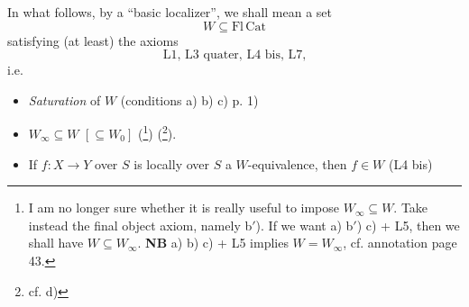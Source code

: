 \documentclass[11pt]{article}
\newcommand{\msp}[1]{\marginpar{\footnotesize [#1]}}
\begin{document}
\msp{page 45}
In what follows, by a ``basic localizer'', we shall mean a set
\[
W \subseteq \mathrm{Fl}\,\mathrm{Cat}
\]
satisfying (at least) the axioms %
\[
\text{L1, L3 quater, L4 bis, L7,}
\]
i.e.

\begin{itemize}
\item[a)] \textit{Saturation} of $W$ (conditions a) b) c) p. 1)

\item[b)] $W_\infty \subseteq W$ $[\subseteq W_0]$ (\footnote[30]{I am no longer sure whether it is really useful to impose $W_\infty \subseteq W$. Take instead the final object axiom, namely b$'$). If we want a) b$'$) c) + L5, then we shall have $W \subseteq W_\infty$. \textbf{NB} a) b) c) + L5 implies $W = W_\infty$, cf. annotation page 43.}) (\footnote[31]{cf. d)}).

\item[c)] If $f : X \longrightarrow Y$ over $S$ is locally over $S$ a $W$-equivalence, then $f \in W$ (L4 bis)
\end{itemize}
\end{document}
